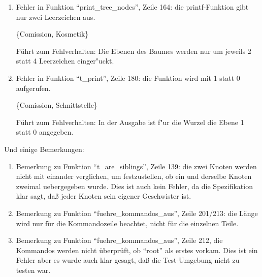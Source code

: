 \begin{enumerate}
% 
% 
% 
% 
% 
% 

\item Fehler in Funktion ``print\_tree\_nodes'', Zeile 164:
die printf-Funktion gibt nur zwei Leerzeichen aus.

\{Comission, Kosmetik\}

F\"uhrt zum Fehlverhalten: Die Ebenen des Baumes werden nur um jeweils 2 statt
4 Leerzeichen einger"uckt.
 

\item Fehler in Funktion ``t\_print'', Zeile 180:
die Funktion wird mit 1 statt 0 aufgerufen.

\{Comission, Schnittstelle\}

F\"uhrt zum Fehlverhalten:  In der Ausgabe ist f"ur die
Wurzel die Ebene 1 statt 0 angegeben.

\end{enumerate}

Und einige Bemerkungen:

\begin{enumerate}

\item Bemerkung zu Funktion ``t\_are\_siblings'', Zeile 139: die
zwei Knoten werden nicht mit einander verglichen, um festzustellen, ob
ein und derselbe Knoten zweimal uebergegeben wurde.  Dies ist auch
kein Fehler, da die Spezifikation klar sagt, da{\ss} jeder Knoten sein 
eigener Geschwister ist.

\item Bemerkung zu Funktion ``fuehre\_kommandos\_aus'', Zeile 201/213: die
L\"ange wird nur f\"ur die Kommandozeile beachtet, nicht f\"ur die
einzelnen Teile.

\item Bemerkung zu Funktion ``fuehre\_kommandos\_aus'', Zeile 212, die
Kommandos werden nicht \"uberpr\"uft, ob ``root'' als erstes vorkam.
Dies ist ein Fehler aber es wurde auch klar gesagt, da{\ss} die
Test-Umgebung nicht zu testen war.

\end{enumerate}

